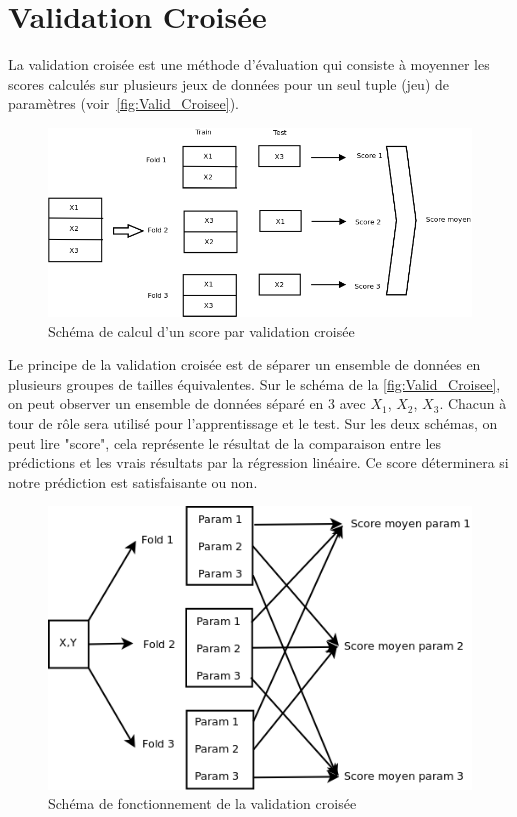 \section{Validation Croisée}

La validation croisée est une méthode d'évaluation qui consiste à moyenner les scores calculés sur plusieurs jeux de données pour un seul tuple (jeu) de paramètres (voir~\autoref{fig:Valid_Croisee}).

\begin{figure}[htpb]
	\centering
	\includegraphics[scale = 0.25]{images/Valid_Croisee_param}
	\caption{Schéma de calcul d'un score par validation croisée}
	\label{fig:Valid_Croisee}
\end{figure}


Le principe de la validation croisée est de séparer un ensemble de données en plusieurs groupes de tailles équivalentes.
Sur le schéma de la  \autoref{fig:Valid_Croisee}, on peut observer un ensemble de données séparé en 3 avec $X_{1}$, $X_{2}$, $X_{3}$.
Chacun à tour de rôle sera utilisé pour l'apprentissage et le test. 
Sur les deux schémas, on peut lire "score", cela représente le résultat de la comparaison entre les prédictions et les vrais résultats par la régression linéaire. Ce score déterminera si notre prédiction est satisfaisante ou non. 

\begin{figure}[htpb]
	\centering
	\includegraphics[scale = 0.25]{images/Valid_Croisee}
	\caption{Schéma de fonctionnement de la validation croisée}
	\label{fig:Valid_Croisee_param}
\end{figure}

